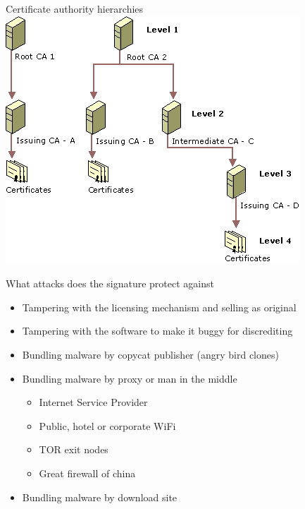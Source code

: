 \documentclass[11pt]{beamer}
\begin{document}
\begin{frame}{Certificate authority hierarchies}
\includegraphics[scale=0.5]{certificate_authority_hierarchies.png}
\end{frame}

\begin{frame}{What attacks does the signature protect against}
\begin{itemize}
\item Tampering with the licensing mechanism and selling as original
\item Tampering with the software to make it buggy for discrediting
\item Bundling malware by copycat publisher (angry bird clones)
\item Bundling malware by proxy or man in the middle
\begin{itemize}
\item Internet Service Provider
\item Public, hotel or corporate WiFi
\item TOR exit nodes
\item Great firewall of china
\end{itemize}
\item Bundling malware by download site
\end{itemize}
\end{frame}
\end{document}
